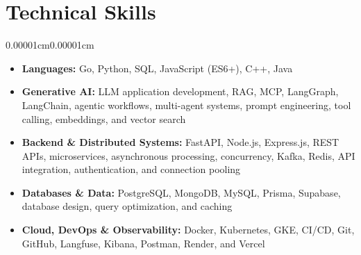 \documentclass[10pt,letterpaper]{article}
\newenvironment{highlights}{
    \begin{itemize}[
        topsep=0.06cm,
        parsep=0.04cm,
        partopsep=0pt,
        itemsep=0pt,
        leftmargin=10pt
    ]
}{
    \end{itemize}
}
\newenvironment{onecolentry}{
    \begin{adjustwidth}{0.00001cm}{0.00001cm}
}{
    \end{adjustwidth}
}
\begin{document}
\section{Technical Skills}

\begin{onecolentry}
    \begin{highlights}
        \item \textbf{Languages:} Go, Python, SQL, JavaScript (ES6+), C++, Java
        \item \textbf{Generative AI:} LLM application development, RAG, MCP, LangGraph, LangChain, agentic workflows, multi-agent systems, prompt engineering, tool calling, embeddings, and vector search
        \item \textbf{Backend \& Distributed Systems:} FastAPI, Node.js, Express.js, REST APIs, microservices, asynchronous processing, concurrency, Kafka, Redis, API integration, authentication, and connection pooling
        \item \textbf{Databases \& Data:} PostgreSQL, MongoDB, MySQL, Prisma, Supabase, database design, query optimization, and caching
        \item \textbf{Cloud, DevOps \& Observability:} Docker, Kubernetes, GKE, CI/CD, Git, GitHub, Langfuse, Kibana, Postman, Render, and Vercel
    \end{highlights}
\end{onecolentry}
\end{document}
